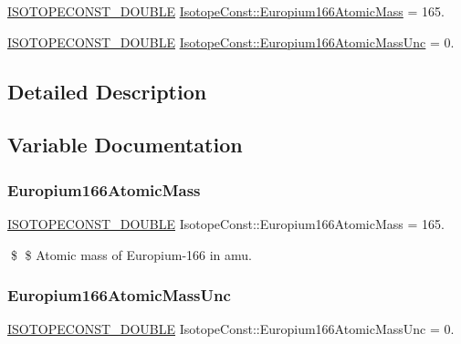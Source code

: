 \begin{DoxyCompactItemize}
\item 
\mbox{\hyperlink{group___isotope_const-_macros_ga8f45a7272ce02c0b4c65c44636ed719a}{I\+S\+O\+T\+O\+P\+E\+C\+O\+N\+S\+T\+\_\+\+D\+O\+U\+B\+LE}} \mbox{\hyperlink{group___isotope_const-_europium-_eu166_gaff51af0255704d764a0c3ff1709756f8}{Isotope\+Const\+::\+Europium166\+Atomic\+Mass}} = 165.
\item 
\mbox{\hyperlink{group___isotope_const-_macros_ga8f45a7272ce02c0b4c65c44636ed719a}{I\+S\+O\+T\+O\+P\+E\+C\+O\+N\+S\+T\+\_\+\+D\+O\+U\+B\+LE}} \mbox{\hyperlink{group___isotope_const-_europium-_eu166_ga9eaa81960896d33c8324623a15eed911}{Isotope\+Const\+::\+Europium166\+Atomic\+Mass\+Unc}} = 0.
\end{DoxyCompactItemize}


\subsection{Detailed Description}


\subsection{Variable Documentation}
\mbox{\label{group___isotope_const-_europium-_eu166_gaff51af0255704d764a0c3ff1709756f8}} 
\subsubsection{\texorpdfstring{Europium166\+Atomic\+Mass}{Europium166AtomicMass}}
{\footnotesize\ttfamily \mbox{\hyperlink{group___isotope_const-_macros_ga8f45a7272ce02c0b4c65c44636ed719a}{I\+S\+O\+T\+O\+P\+E\+C\+O\+N\+S\+T\+\_\+\+D\+O\+U\+B\+LE}} Isotope\+Const\+::\+Europium166\+Atomic\+Mass = 165.}

\$ \$ Atomic mass of Europium-\/166 in amu. \mbox{\label{group___isotope_const-_europium-_eu166_ga9eaa81960896d33c8324623a15eed911}} 
\subsubsection{\texorpdfstring{Europium166\+Atomic\+Mass\+Unc}{Europium166AtomicMassUnc}}
{\footnotesize\ttfamily \mbox{\hyperlink{group___isotope_const-_macros_ga8f45a7272ce02c0b4c65c44636ed719a}{I\+S\+O\+T\+O\+P\+E\+C\+O\+N\+S\+T\+\_\+\+D\+O\+U\+B\+LE}} Isotope\+Const\+::\+Europium166\+Atomic\+Mass\+Unc = 0.}

